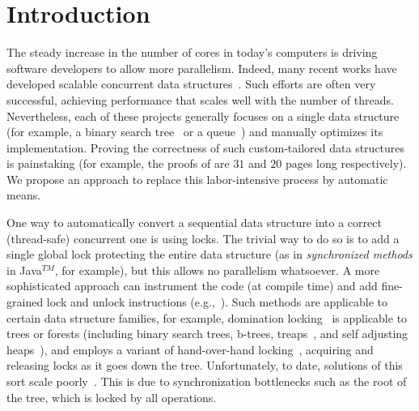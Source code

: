 
\section{Introduction} \label{sec:intro}

The steady increase in the number of  cores in today's computers is driving software developers to allow more parallelism.
Indeed, many recent works have developed scalable concurrent data
structures~\cite{ArbelA2014,DrachslerVY2014,NatarajanM2014,BrownER2014,CrainGR2013,BraginskyP2012,
AfekKKMT2012,EllenFRB2010,BronsonCCO2010,HerlihyLLS2007,Michael:1996}.
Such efforts are often very successful, achieving performance that scales well
with the number of threads.
Nevertheless, each of these projects generally focuses on a single data
structure (for example, a binary search tree~\cite{ArbelA2014} or a queue~\cite{Michael:1996}) and manually optimizes its implementation.
Proving the correctness of such custom-tailored data structures is painstaking
(for example, the proofs of \cite{BraginskyP2012,EllenFRB2010} are $31$ and $20$ pages long
respectively). We propose an approach to replace this labor-intensive process by automatic means.

One way to automatically convert a sequential data structure into a correct
(thread-safe) concurrent one is using locks.
The trivial way to do so is to add a single global lock protecting the entire data structure
(as in \emph{synchronized methods} in Java$^{TM}$, for example), but this allows no parallelism whatsoever.
A more sophisticated approach can instrument the code (at compile time) and add
fine-grained lock and unlock instructions (e.g.,~\cite{Gueta2011,MZGB:POPL06}). Such
methods are applicable to certain data structure families, for example,
domination locking~\cite{Gueta2011} is applicable to trees or forests
(including binary search trees, b-trees, treaps~\cite{AragonS1989}, and self adjusting heaps~\cite{Sleator:SAH1986:SAH}),
and employs a variant of hand-over-hand locking~\cite{SilberschatzK1980},
acquiring and releasing locks as it goes down the tree.
Unfortunately, to date, solutions of this sort scale poorly~\cite{Gueta2011}.
This is due to synchronization bottlenecks such as the root of the tree,
which is locked by all operations.

